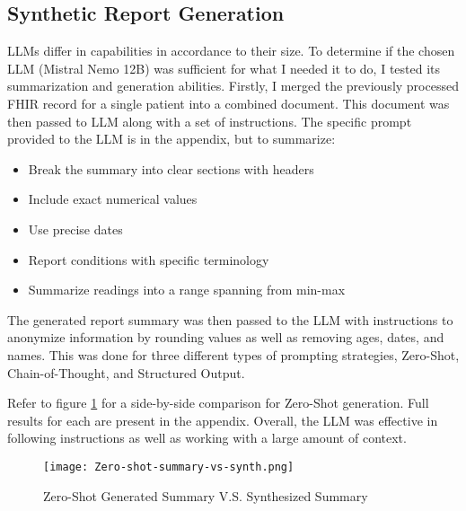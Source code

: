\subsection{Synthetic Report Generation}
LLMs differ in capabilities in accordance to their size.
To determine if the chosen LLM (Mistral Nemo 12B) was sufficient for what I needed it to do, I tested its summarization and generation abilities.
Firstly, I merged the previously processed FHIR record for a single patient into a combined document.
This document was then passed to LLM along with a set of instructions.
The specific prompt provided to the LLM is in the appendix, but to summarize:
\begin{itemize}
	\item Break the summary into clear sections with headers
	\item Include exact numerical values
	\item Use precise dates
	\item Report conditions with specific terminology
	\item Summarize readings into a range spanning from min-max
\end{itemize}

The generated report summary was then passed to the LLM with instructions to anonymize information by rounding values as well as removing ages, dates, and names.
This was done for three different types of prompting strategies, Zero-Shot, Chain-of-Thought, and Structured Output.

Refer to figure \ref{fig:SynthSummary} for a side-by-side comparison for Zero-Shot generation.
Full results for each are present in the appendix.
Overall, the LLM was effective in following instructions as well as working with a large amount of context.

\begin{figure}
	\texttt{[image: Zero-shot-summary-vs-synth.png]}
	\centering
	\caption{Zero-Shot Generated Summary V.S. Synthesized Summary}
	\label{fig:SynthSummary}
\end{figure}
